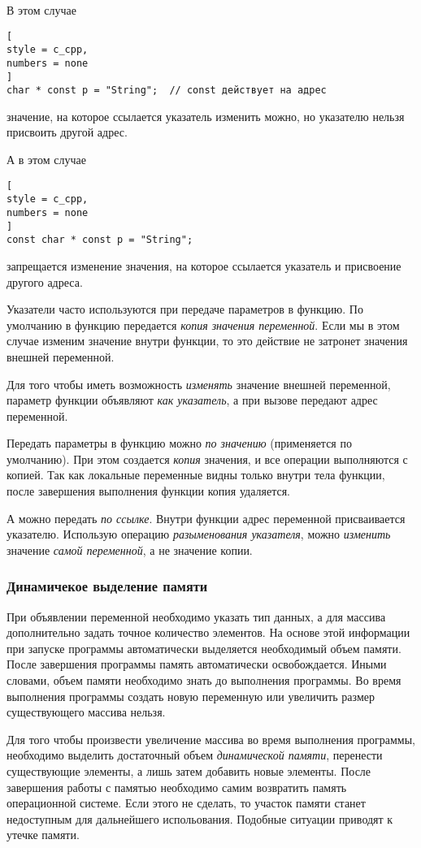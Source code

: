 \documentclass[%
	11pt,
	a4paper,
	utf8,
		]{article}
\begin{document}
В этом случае
\begin{lstlisting}[
style = c_cpp,
numbers = none
]
char * const p = "String";  // const действует на адрес
\end{lstlisting}
значение, на которое ссылается указатель изменить можно, но указателю нельзя присвоить другой адрес.

А в этом случае
\begin{lstlisting}[
style = c_cpp,
numbers = none
]
const char * const p = "String";
\end{lstlisting}
запрещается изменение значения, на которое ссылается указатель и присвоение другого адреса.

Указатели часто используются при передаче параметров в функцию. По умолчанию в функцию передается \emph{копия значения переменной}. Если мы в этом случае изменим значение внутри функции, то это действие не затронет значения внешней переменной.

Для того чтобы иметь возможность \emph{изменять} значение внешней переменной, параметр функции объявляют \emph{как указатель}, а при вызове передают адрес переменной.

Передать параметры в функцию можно \emph{по значению} (применяется по умолчанию). При этом создается \emph{копия} значения, и все операции выполняются с копией. Так как локальные переменные видны только внутри тела функции, после завершения выполнения функции копия удаляется. 

А можно передать \emph{по ссылке}. Внутри функции адрес переменной присваивается указателю. Использую операцию \emph{разыменования указателя}, можно \emph{изменить} значение \emph{самой переменной}, а не значение копии. 

\subsubsection{Динамичекое выделение памяти}

При объявлении переменной необходимо указать тип данных, а для массива дополнительно задать точное количество элементов. На основе этой информации при запуске программы автоматически выделяется необходимый объем памяти. После завершения программы память автоматически освобождается. Иными словами, объем памяти необходимо знать до выполнения программы. Во время выполнения программы создать новую переменную или увеличить размер существующего массива нельзя.

Для того чтобы произвести  увеличение массива во время выполнения программы, необходимо выделить достаточный объем \emph{динамической памяти}, перенести существующие элементы, а лишь затем добавить новые элементы. После завершения работы с памятью необходимо самим возвратить память операционной системе. Если этого не сделать, то участок памяти станет недоступным для дальнейшего испольования. Подобные ситуации приводят к утечке памяти.
\end{document}
